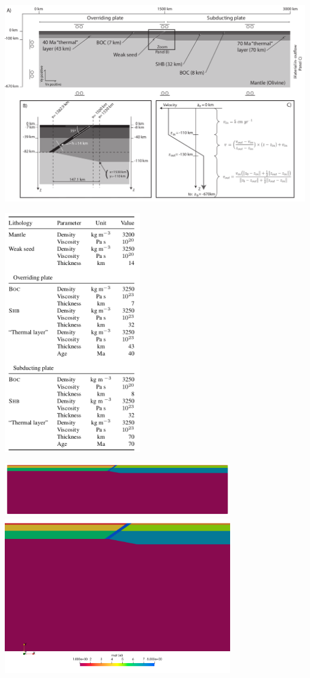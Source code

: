 
\includegraphics[width=\linewidth]{python_codes/fieldstone_62/quin14_setup}

\includegraphics[width=6cm]{python_codes/fieldstone_62/quin14_mats}

\begin{center}
\includegraphics[width=10cm]{python_codes/fieldstone_62/mats1}\\
\includegraphics[width=10cm]{python_codes/fieldstone_62/mats2}
\end{center}

